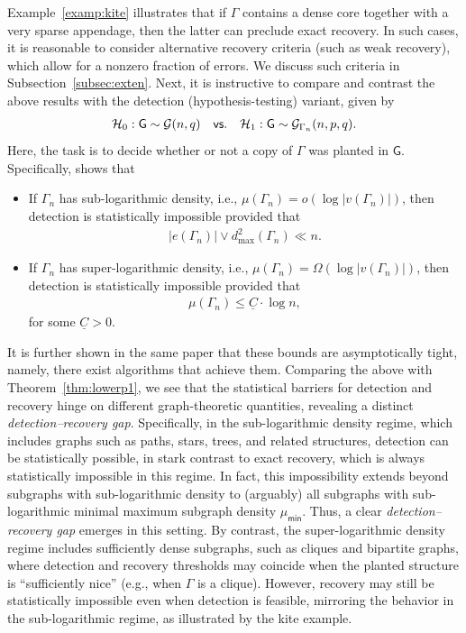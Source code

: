 \documentclass[12pt]{article}
\newcommand{\calG}{{\cal G}}
\newcommand{\calH}{{\cal H}}
\newcommand{\s}[1]{\mathsf{#1}}
\begin{document}
Example~\ref{examp:kite} illustrates that if $\Gamma$ contains a dense core together with a very sparse appendage, then the latter can preclude exact recovery. In such cases, it is reasonable to consider alternative recovery criteria (such as weak recovery), which allow for a nonzero fraction of errors. We discuss such criteria in Subsection~\ref{subsec:exten}. Next, it is instructive to compare and contrast the above results with the detection (hypothesis-testing) variant, given by
\begin{align}
\calH_0: \s{G} \sim \calG(n,q) \quad \s{vs.} \quad \calH_1: \s{G} \sim \calG_{\Gamma_n}(n,p,q).\label{eqn:super_hypo}   
\end{align}
Here, the task is to decide whether or not a copy of $\Gamma$ was planted in $\s{G}$. Specifically, \cite[Thm.~1]{elimelech2025detecting} shows that 
\begin{itemize}
    \item If $\Gamma_n$ has sub-logarithmic density, i.e., $\mu(\Gamma_n)=o(\log|v(\Gamma_n)|)$, then detection is statistically impossible provided that
    \begin{align}
        |e(\Gamma_n)|\vee d_{\max}^2(\Gamma_n)\ll n.\label{eqn:Dec1IMP}
    \end{align}
    \item If $\Gamma_n$ has super-logarithmic density, i.e., $\mu(\Gamma_n)=\Omega(\log|v(\Gamma_n)|)$, then detection is statistically impossible provided that
    \begin{align}
        \mu(\Gamma_n) \leq \underline{C} \cdot \log n,\label{eqn:Dec2IMP}
    \end{align}
    for some $\underline{C}>0$.
\end{itemize}
It is further shown in the same paper that these bounds are asymptotically tight, namely, there exist algorithms that achieve them. Comparing the above with Theorem~\ref{thm:lowerp1}, we see that the statistical barriers for detection and recovery hinge on different graph-theoretic quantities, revealing a distinct \emph{detection--recovery gap}. Specifically, in the sub-logarithmic density regime, which includes graphs such as paths, stars, trees, and related structures, detection can be statistically possible, in stark contrast to exact recovery, which is always statistically impossible in this regime. In fact, this impossibility extends beyond subgraphs with sub-logarithmic density to (arguably) all subgraphs with sub-logarithmic minimal maximum subgraph density $\mu_{\s{min}}$. Thus, a clear \emph{detection--recovery gap} emerges in this setting. By contrast, the super-logarithmic density regime includes sufficiently dense subgraphs, such as cliques and bipartite graphs, where detection and recovery thresholds may coincide when the planted structure is ``sufficiently nice'' (e.g., when $\Gamma$ is a clique). However, recovery may still be statistically impossible even when detection is feasible, mirroring the behavior in the sub-logarithmic regime, as illustrated by the kite example. 
\end{document}
